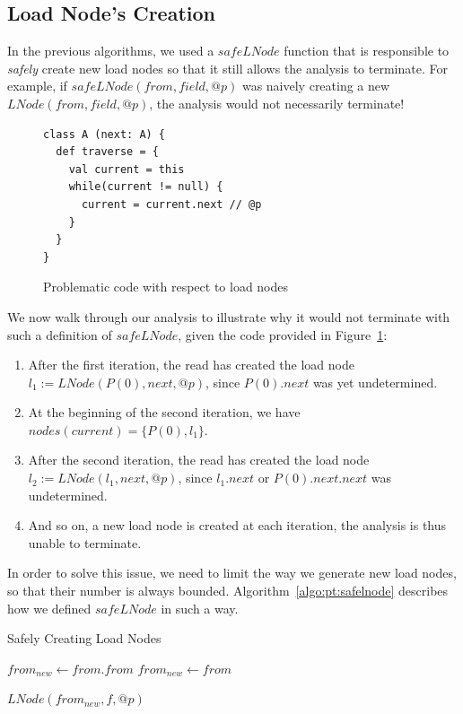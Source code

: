 \subsection{Load Node's Creation}
In the previous algorithms, we used a $safeLNode$ function that is responsible
to \emph{safely} create new load nodes so that it still allows the analysis
to terminate. For example, if $safeLNode(from, field, @p)$ was naively creating
a new $LNode(from, field, @p)$, the analysis would not necessarily terminate!

\begin{figure}[h]
\begin{lstlisting}
class A (next: A) {
  def traverse = {
    val current = this
    while(current != null) {
      current = current.next // @p
    }
  }
}
\end{lstlisting}
    \caption{Problematic code with respect to load nodes}
    \label{fig:pt:lnodeloop}
\end{figure}

We now walk through our analysis to illustrate why it would not terminate with
such a definition of $safeLNode$, given the code provided in
Figure~\ref{fig:pt:lnodeloop}:
\begin{enumerate}
    \item After the first iteration, the read has created the load node \\
    $l_1 := LNode(P(0), next, @p)$, since $P(0).next$ was yet undetermined.
    \item At the beginning of the second iteration, we have $nodes(current) =
    \{ P(0), l_1 \}$.
    \item After the second iteration, the read has created the load node
    $l_2 := LNode(l_1, next, @p)$, since $l_1.next$ or  $P(0).next.next$ was
    undetermined.
    \item And so on, a new load node is created at each iteration, the analysis
    is thus unable to terminate.
\end{enumerate}

In order to solve this issue, we need to limit the way we generate new load
nodes, so that their number is always bounded.
Algorithm~\ref{algo:pt:safelnode} describes how we defined $safeLNode$ in such
a way.

\begin{algorithm}
\caption{Safely Creating Load Nodes}\label{algo:pt:safelnode}
\begin{algorithmic}[1]
        \State $from_{new} \gets from.from$
    \Else
        \State $from_{new} \gets from$
    \EndIf

    \State \Return $LNode(from_{new}, f, @p)$
\EndFunction
\end{algorithmic}
\end{algorithm}

